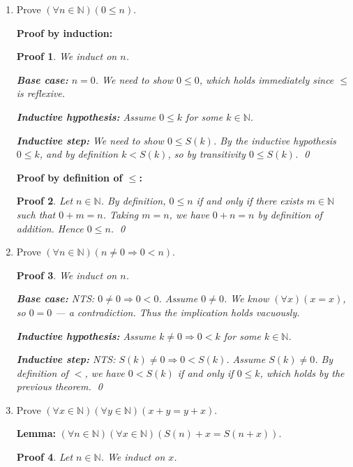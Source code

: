 \documentclass[12pt]{article}
\theoremstyle{proofstyle}
\newtheorem*{proof*}{Proof}
\begin{document}
\begin{enumerate}[left=0pt, itemsep=2em, parsep=1em]
\item Prove $(\forall n \in \mathbb{N})(0 \leq n)$.

\textbf{Proof by induction:}

\begin{proof*}
    We induct on $n$.

    \textbf{Base case:} $n = 0$. We need to show $0 \leq 0$, which holds
    immediately since $\leq$ is reflexive.

    \textbf{Inductive hypothesis:} Assume $0 \leq k$ for some $k \in \mathbb{N}$.

    \textbf{Inductive step:} We need to show $0 \leq S(k)$.
    By the inductive hypothesis $0 \leq k$, and by definition $k < S(k)$,
    so by transitivity $0 \leq S(k)$. \qed
\end{proof*}

\textbf{Proof by definition of $\leq$:}

\begin{proof*}
    Let $n \in \mathbb{N}$. By definition, $0 \leq n$ if and only if there
    exists $m \in \mathbb{N}$ such that $0 + m = n$. Taking $m = n$, we have
    $0 + n = n$ by definition of addition. Hence $0 \leq n$. \qed
\end{proof*}

\item Prove $(\forall n \in \mathbb{N})(n \neq 0 \Rightarrow 0 < n)$.

\begin{proof*}
    We induct on $n$.

    \textbf{Base case:} NTS: $0 \neq 0 \Rightarrow 0 < 0$.
    Assume $0 \neq 0$. We know $(\forall x)(x = x)$, so $0 = 0$ ---
    a contradiction. Thus the implication holds vacuously.

    \textbf{Inductive hypothesis:} Assume $k \neq 0 \Rightarrow 0 < k$
    for some $k \in \mathbb{N}$.

    \textbf{Inductive step:} NTS: $S(k) \neq 0 \Rightarrow 0 < S(k)$.
    Assume $S(k) \neq 0$. By definition of $<$, we have $0 < S(k)$
    if and only if $0 \leq k$, which holds by the previous theorem. \qed
\end{proof*}

\item Prove $(\forall x \in \mathbb{N})(\forall y \in \mathbb{N})(x + y = y + x)$.

\textbf{Lemma:} $(\forall n \in \mathbb{N})(\forall x \in \mathbb{N})(S(n) + x = S(n + x))$.

\begin{proof*}
    Let $n \in \mathbb{N}$. We induct on $x$.


\end{proof*}
\end{enumerate}
\end{document}
